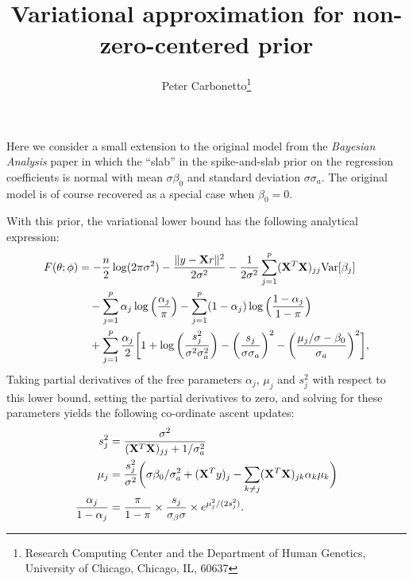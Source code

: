 \documentclass[final]{siamltex}
\title{Variational approximation for non-zero-centered prior}
\author{Peter Carbonetto\thanks{Research Computing Center and the
    Department of Human Genetics, University of Chicago, Chicago, IL,
    60637}}
\begin{document}
\maketitle

\noindent Here we consider a small extension to the original model
from the {\em Bayesian Analysis} paper in which the ``slab'' in the
spike-and-slab prior on the regression coefficients is normal with
mean $\sigma \beta_0$ and standard deviation $\sigma \sigma_a$. The
original model is of course recovered as a special case when $\beta_0
= 0$.

With this prior, the variational lower bound has the following
analytical expression:
\begin{align}
F(\theta; \phi) &=
 - \frac{n}{2}\log(2\pi\sigma^2)
- \frac{\|y - {\bf X}r\|^2}{2\sigma^2} 
- \frac{1}{2\sigma^2} \sum_{j=1}^p ({\bf X}^T{\bf X})_{jj}
  \mathrm{Var}[\beta_j]
  \nonumber \\
&\quad - \sum_{j=1}^p \alpha_j \log\Big(\frac{\alpha_j}{\pi}\Big)
       - \sum_{j=1}^p (1-\alpha_j) \log\Big(\frac{1-\alpha_j}{1-\pi}\Big)
  \nonumber \\
&\quad + \sum_{j=1}^p \frac{\alpha_j}{2} \bigg[
1 + \log\bigg(\frac{s_j^2}{\sigma^2 \sigma_a^2}\bigg)
  - \bigg(\frac{s_j}{\sigma\sigma_a}\bigg)^2
  - \bigg(\frac{\mu_j/\sigma - \beta_0}{\sigma_a}\bigg)^2 \bigg],
\end{align}
Taking partial derivatives of the free parameters $\alpha_j$, $\mu_j$
and $s_j^2$ with respect to this lower bound, setting the partial
derivatives to zero, and solving for these parameters yields the
following co-ordinate ascent updates:
\begin{align}
s_j^2 &= \frac{\sigma^2}{({\bf X}^T{\bf X})_{jj} + 1/\sigma_a^2} \\
\mu_j &= \frac{s_j^2}{\sigma^2} \bigg(\sigma \beta_0/\sigma_a^2 +
  ({\bf X}^Ty)_j - \sum_{k \neq j}
  ({\bf X}^T{\bf X})_{jk} \alpha_k \mu_k \bigg) \\
\frac{\alpha_j}{1-\alpha_j} &= \frac{\pi}{1-\pi} \times 
  \frac{s_j}{\sigma_{\beta}\sigma} \times e^{\mu_j^2/(2s_j^2)}.
\end{align}
\end{document}
